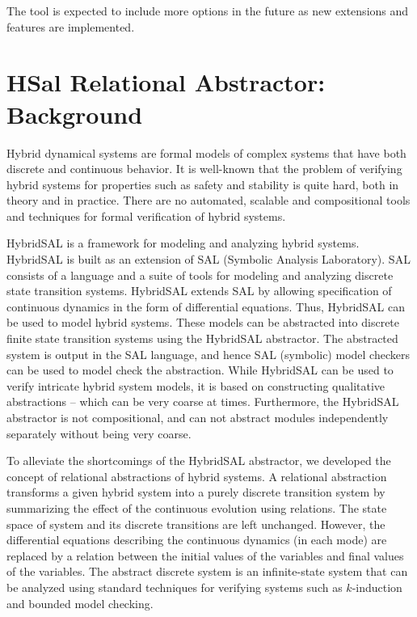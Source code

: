 \documentclass{article}
\begin{document}
The tool is expected to include more options in the future
as new extensions and features are implemented.

\section{HSal Relational Abstractor: Background}

Hybrid dynamical systems are formal models of complex systems 
that have both discrete and continuous behavior.  
It is well-known that the problem of verifying hybrid systems for
properties such as safety and stability is quite
hard, both in theory and in practice.  There are no automated,
scalable and compositional tools and techniques for formal 
verification of hybrid systems.

HybridSAL is a framework for modeling and analyzing hybrid systems.
HybridSAL is built as an extension of SAL (Symbolic Analysis Laboratory).
SAL consists of a language and a suite of tools for modeling and 
analyzing discrete state transition systems.  HybridSAL extends SAL 
by allowing specification of continuous dynamics in the form of 
differential equations.
Thus, HybridSAL can be used to model hybrid systems.
These models can be abstracted into discrete  finite state transition
systems using the HybridSAL abstractor.  The abstracted system
is output in the SAL language, and hence SAL (symbolic) model 
checkers can be used to model check the abstraction.
While HybridSAL can be used to verify intricate hybrid system models,
it is based on constructing qualitative abstractions -- which can
be very coarse at times.  Furthermore, the HybridSAL abstractor is
not compositional, and can not abstract modules independently
separately without being very coarse.

To alleviate the shortcomings of the HybridSAL abstractor,
we developed the concept of relational abstractions of hybrid
systems.  A relational abstraction transforms a given hybrid system into
a purely discrete transition system by summarizing the effect
of the continuous evolution using relations.   The state space
of system and its discrete transitions are left unchanged. 
However, the differential equations describing the
continuous dynamics (in each mode) are replaced by a 
relation between the initial values of the variables and 
final values of the variables.
The abstract discrete system is an infinite-state system that can be
analyzed using standard techniques for verifying systems such
as $k$-induction and bounded model checking.
\end{document}

